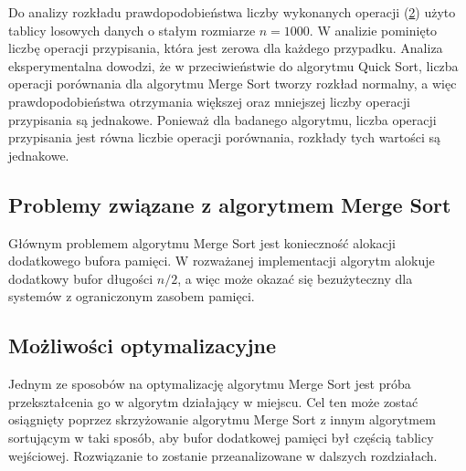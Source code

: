 Do analizy rozkładu prawdopodobieństwa liczby wykonanych operacji (\ref{fig:merge-sort-density}) użyto tablicy losowych danych o stałym rozmiarze $n = 1000$. W analizie pominięto liczbę operacji przypisania, która jest zerowa dla każdego przypadku. Analiza eksperymentalna dowodzi, że w przeciwieństwie do algorytmu Quick Sort, liczba operacji porównania dla algorytmu Merge Sort tworzy rozkład normalny, a więc prawdopodobieństwa otrzymania większej oraz mniejszej liczby operacji przypisania są jednakowe. Ponieważ dla badanego algorytmu, liczba operacji przypisania jest równa liczbie operacji porównania, rozkłady tych wartości są jednakowe.

\begin{figure}[H]
	\centering
	
	\caption[]{}
	\label{fig:merge-sort-optimistic-average-pessimistic-case}
\end{figure}

\begin{figure}[H]
	\centering
	
	\caption[]{}
	\label{fig:merge-sort-density}
\end{figure}

\subsection{Problemy związane z algorytmem Merge Sort}
Głównym problemem algorytmu Merge Sort jest konieczność alokacji dodatkowego bufora pamięci. W rozważanej implementacji algorytm alokuje dodatkowy bufor długości $n/2$, a więc może okazać się bezużyteczny dla systemów z ograniczonym zasobem pamięci.\\

\subsection{Możliwości optymalizacyjne}
Jednym ze sposobów na optymalizację algorytmu Merge Sort jest próba przekształcenia go w algorytm działający w miejscu.
Cel ten może zostać osiągnięty poprzez skrzyżowanie algorytmu Merge Sort z innym algorytmem sortującym w taki sposób, aby bufor dodatkowej pamięci był częścią tablicy wejściowej. Rozwiązanie to zostanie przeanalizowane w dalszych rozdziałach.\\
